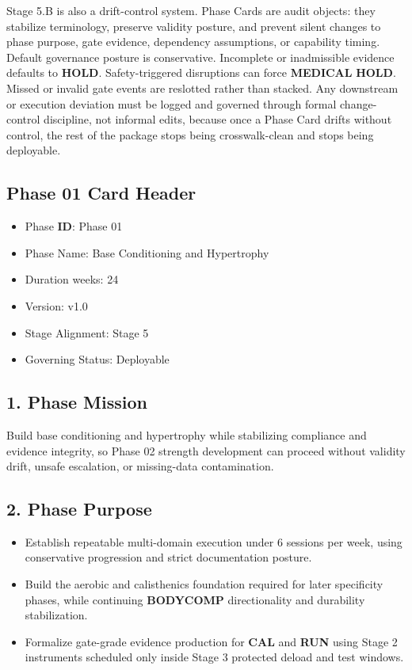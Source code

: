 \documentclass[10pt]{article}
\begin{document}
Stage 5.B is also a drift-control system. Phase Cards are audit objects: they stabilize terminology, preserve validity posture, and prevent silent changes to phase purpose, gate evidence, dependency assumptions, or capability timing. Default governance posture is conservative. Incomplete or inadmissible evidence defaults to \textbf{HOLD}. Safety-triggered disruptions can force \textbf{MEDICAL} \textbf{HOLD}. Missed or invalid gate events are reslotted rather than stacked. Any downstream or execution deviation must be logged and governed through formal change-control discipline, not informal edits, because once a Phase Card drifts without control, the rest of the package stops being crosswalk-clean and stops being deployable.

\subsection*{Phase 01 Card Header}
{}

\begin{itemize}
\item Phase \textbf{ID}: Phase 01
\item Phase Name: Base Conditioning and Hypertrophy
\item Duration weeks: 24
\item Version: v1.0
\item Stage Alignment: Stage 5
\item Governing Status: Deployable
\end{itemize}

\subsection*{1. Phase Mission}

Build base conditioning and hypertrophy while stabilizing compliance and evidence integrity, so Phase 02 strength development can proceed without validity drift, unsafe escalation, or missing-data contamination.

\subsection*{2. Phase Purpose}

\begin{itemize}
\item Establish repeatable multi-domain execution under 6 sessions per week, using conservative progression and strict documentation posture.
\item Build the aerobic and calisthenics foundation required for later specificity phases, while continuing \textbf{BODYCOMP} directionality and durability stabilization.
\item Formalize gate-grade evidence production for \textbf{CAL} and \textbf{RUN} using Stage 2 instruments scheduled only inside Stage 3 protected deload and test windows.
\end{itemize}
\end{document}

